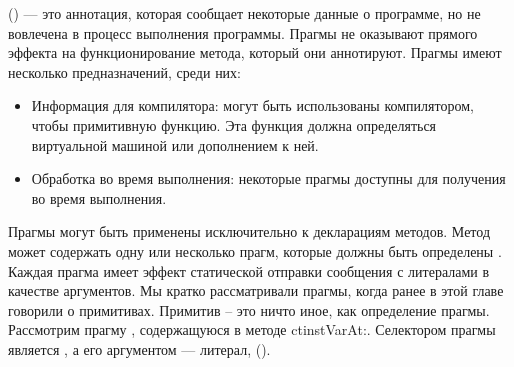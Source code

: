 \documentclass[a4paper,10pt,twoside]{book}
\begin{document}
{%
 () --- это аннотация, которая сообщает некоторые данные о программе, но не вовлечена в процесс выполнения программы. Прагмы не оказывают прямого эффекта на функционирование метода, который они аннотируют.
Прагмы имеют несколько предназначений, среди них:
\begin{itemize}
\item Информация для компилятора:  могут быть использованы компилятором, чтобы  примитивную функцию. Эта функция должна определяться виртуальной машиной или дополнением к ней.
\item Обработка во время выполнения: некоторые прагмы доступны для получения во время выполнения.
\end{itemize}

Прагмы могут быть применены исключительно к декларациям методов. Метод может содержать одну или несколько прагм, которые должны быть определены . Каждая прагма имеет эффект статической отправки сообщения с литералами в качестве аргументов.
Мы кратко рассматривали прагмы, когда ранее в этой главе говорили о примитивах. Примитив -- это ничто иное, как определение прагмы.
Рассмотрим прагму , содержащуюся в методе ct{instVarAt:}. Селектором прагмы является , а его аргументом --- литерал,  ().

}
\end{document}
